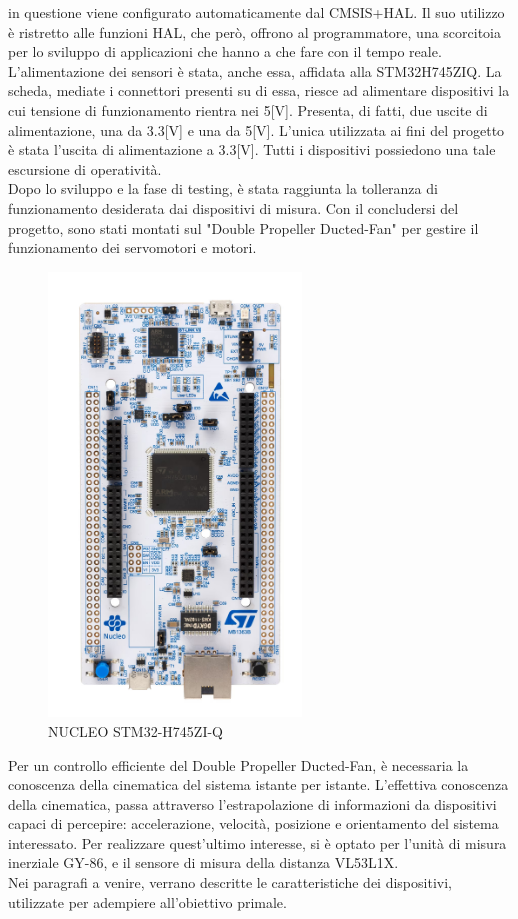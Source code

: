 \documentclass[11pt]{report}
\begin{document}
in questione viene configurato automaticamente dal CMSIS+HAL. Il suo utilizzo è ristretto alle funzioni HAL, che però, offrono al programmatore, una scorcitoia per lo sviluppo di applicazioni che hanno a che fare con il tempo reale.\\
L'alimentazione dei sensori è stata, anche essa, affidata alla STM32H745ZIQ. La scheda, mediate i connettori presenti su di essa, riesce ad alimentare dispositivi la cui tensione di funzionamento rientra nei 5[V]. Presenta, di fatti, due uscite di alimentazione, una da 3.3[V] e una da 5[V]. L'unica utilizzata ai fini del progetto è stata l'uscita di alimentazione a 3.3[V]. Tutti i dispositivi possiedono una tale escursione di operatività.\\
Dopo lo sviluppo e la fase di testing, è stata raggiunta la tolleranza di funzionamento desiderata dai dispositivi di misura. Con il concludersi del progetto, sono stati montati sul "Double Propeller Ducted-Fan" per gestire il funzionamento dei servomotori e motori.

\begin{figure}[H]
    \centering
    \includegraphics[width = 0.6\textwidth]{images/Immagine_1_relazione__IMMAGINE_STM32H745ZIQ.jpg}
    \caption{NUCLEO STM32-H745ZI-Q}
    \label{fig:etichetta}
\end{figure}
Per un controllo efficiente del Double Propeller Ducted-Fan, è necessaria la conoscenza della cinematica del sistema istante per istante.
L'effettiva conoscenza della cinematica, passa attraverso l'estrapolazione di informazioni da dispositivi capaci di percepire: accelerazione, velocità, posizione e orientamento del sistema interessato.
Per realizzare quest'ultimo interesse, si è optato per l'unità di misura inerziale GY-86, e il sensore di misura della distanza VL53L1X.\\
Nei paragrafi a venire, verrano descritte le caratteristiche dei dispositivi, utilizzate per adempiere all'obiettivo primale.
\end{document}
